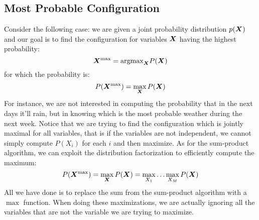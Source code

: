 \subsection{Most Probable Configuration}
Consider the following case: we are given a joint probability distribution $p(\bm{X})$ and our goal is to find the configuration for variables $\bm{X}$ having the highest probability:
\[\bm{X}^{\text{max}}=\text{argmax}_{\bm{X}}P(\bm{X})\]
for which the probability is:
\[P(\bm{X}^{\text{max}})=\max\limits_{\bm{X}}P(\bm{X})\]
For instance, we are not interested in computing the probability that in the next days it'll rain, but in knowing which is the most probable weather during the next week. \newline
Notice that we are trying to find the configuration which is jointly maximal for all variables, that is if the variables are not independent, we cannot simply compute $P(X_i)$ for each $i$ and then maximize. \newline
As for the sum-product algorithm, we can exploit the distribution factorization to efficiently compute the maximum:
\[P(\bm{X}^{\text{max}})=\max\limits_{\bm{X}}P(\bm{X})=\max\limits_{X_1}\hdots\max\limits_{X_M}P(\bm{X})\]
All we have done is to replace the sum from the sum-product algorithm with a $\max$ function. When doing these maximizations, we are actually ignoring all the variables that are not the variable we are trying to maximize.
%
